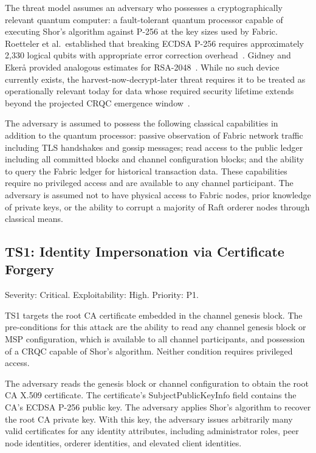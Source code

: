 \documentclass[conference]{IEEEtran}
\begin{document}
The threat model assumes an adversary who possesses a cryptographically
relevant quantum computer: a fault-tolerant quantum processor capable of
executing Shor's algorithm against P-256 at the key sizes used by Fabric.
Roetteler et al.\ established that breaking ECDSA P-256 requires
approximately 2,330 logical qubits with appropriate error correction
overhead~\cite{roetteler2017}. Gidney and Eker{\aa} provided analogous
estimates for RSA-2048~\cite{gidney2021}. While no such device currently
exists, the harvest-now-decrypt-later threat requires it to be treated as
operationally relevant today for data whose required security lifetime
extends beyond the projected CRQC emergence window~\cite{mosca2018}.

The adversary is assumed to possess the following classical capabilities
in addition to the quantum processor: passive observation of Fabric
network traffic including TLS handshakes and gossip messages; read access
to the public ledger including all committed blocks and channel
configuration blocks; and the ability to query the Fabric ledger for
historical transaction data. These capabilities require no privileged
access and are available to any channel participant. The adversary is
assumed not to have physical access to Fabric nodes, prior knowledge of
private keys, or the ability to corrupt a majority of Raft orderer nodes
through classical means.

\subsection{TS1: Identity Impersonation via Certificate Forgery}

Severity: Critical. Exploitability: High. Priority: P1.

TS1 targets the root CA certificate embedded in the channel genesis block.
The pre-conditions for this attack are the ability to read any channel
genesis block or MSP configuration, which is available to all channel
participants, and possession of a CRQC capable of Shor's algorithm.
Neither condition requires privileged access.

The adversary reads the genesis block or channel configuration to obtain
the root CA X.509 certificate. The certificate's SubjectPublicKeyInfo
field contains the CA's ECDSA P-256 public key. The adversary applies
Shor's algorithm to recover the root CA private key. With this key,
the adversary issues arbitrarily many valid certificates for any identity
attributes, including administrator roles, peer node identities, orderer
identities, and elevated client identities.
\end{document}
